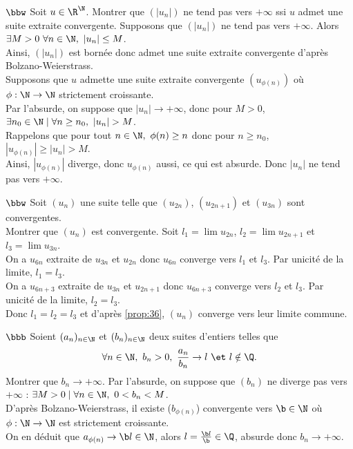 \documentclass[11pt]{article}
\begin{document}
\vspace*{-0.2cm}

\begin{exercice}{$\bbw$}{}
    Soit $u\in\R^\N$. Montrer que $(|u_n|)$ ne tend pas vers $+\infty$ ssi $u$ admet une suite extraite convergente.
    \tcblower
    \boxed{\ra} Supposons que $(|u_n|)$ ne tend pas vers $+\infty$. Alors $\exists M>0 ~ \forall n \in \N, ~ |u_n| \leq M$.\\
    Ainsi, $(|u_n|)$ est bornée donc admet une suite extraite convergente d'après Bolzano-Weierstrass.\\
    \boxed{\la} Supposons que $u$ admette une suite extraite convergente $(u_{\phi(n)})$ où $\phi:\N\to\N$ strictement croissante.\\
    Par l'absurde, on suppose que $|u_n|\to+\infty$, donc pour $M>0$, $\exists n_0 \in \N \mid \forall n \geq n_0, ~ |u_n| > M$.\\
    Rappelons que pour tout $n\in\N, ~ \phi(n)\geq n$ donc pour $n\geq n_0$, $|u_{\phi(n)}|\geq|u_n|>M$.\\
    Ainsi, $|u_{\phi(n)}|$ diverge, donc $u_{\phi(n)}$ aussi, ce qui est absurde. Donc $|u_n|$ ne tend pas vers $+\infty$.
\end{exercice}

\vspace*{-0.2cm}

\begin{exercice}{$\bbw$}{}
    Soit $(u_n)$ une suite telle que $(u_{2n})$, $(u_{2n+1})$ et $(u_{3n})$ sont convergentes.\\
    Montrer que $(u_n)$ est convergente.
    \tcblower
    Soit $l_1=\lim u_{2n}$, $l_2=\lim u_{2n+1}$ et $l_3=\lim u_{3n}$.\\
    On a $u_{6n}$ extraite de $u_{3n}$ et $u_{2n}$ donc $u_{6n}$ converge vers $l_1$ et $l_3$. Par unicité de la limite, $l_1=l_3$.\\
    On a $u_{6n+3}$ extraite de $u_{3n}$ et $u_{2n+1}$ donc $u_{6n+3}$ converge vers $l_2$ et $l_3$. Par unicité de la limite, $l_2=l_3$.\\
    Donc $l_1=l_2=l_3$ et d'après \ref{prop:36}, $(u_n)$ converge vers leur limite commune.
\end{exercice}

\vspace*{-0.2cm}

\begin{exercice}{$\bbb$}{}
    Soient $(a_n)_{n\in\N}$ et $(b_n)_{n\in\N}$ deux suites d'entiers telles que 
    \begin{equation*}
        \forall n \in \N, ~ b_n > 0, ~ \frac{a_n}{b_n} \to l ~ \et ~ l \notin \Q.
    \end{equation*}
    Montrer que $b_n\to+\infty$.
    \tcblower
    Par l'absurde, on suppose que $(b_n)$ ne diverge pas vers $+\infty$ : $\exists M>0 \mid \forall n \in \N, ~ 0 < b_n < M$.\\
    D'après Bolzano-Weierstrass, il existe ($b_{\phi(n)}$) convergente vers $\b\in\N$ où $\phi:\N\to\N$ est strictement croissante.\\
    On en déduit que $a_{\phi(n)}\to \b l\in \N$, alors $l=\frac{\b l}{\b}\in\Q$, absurde donc $b_n\to+\infty$. 
\end{exercice}
\end{document}
